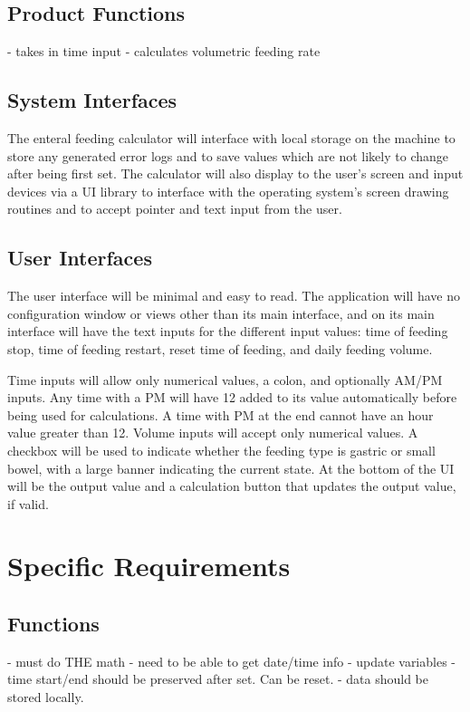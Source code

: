 \documentclass[10pt,draftclsnofoot,onecolumn]{IEEEtran}
\begin{document}
\subsection{Product Functions}
- takes in time input
- calculates volumetric feeding rate

\subsection{System Interfaces}
The enteral feeding calculator will interface with local storage on the machine to store any generated 
error logs and to save values which are not likely to change after being first set. The calculator will
also display to the user's screen and input devices via a UI library to interface with the operating system's screen drawing
routines and to accept pointer and text input from the user.

\subsection{User Interfaces}
The user interface will be minimal and easy to read. The application will have no configuration window
or views other than its main interface, and on its main interface will have the text inputs for the different
input values: time of feeding stop, time of feeding restart, reset time of feeding, and daily feeding volume.

Time inputs will allow only numerical values, a colon, and optionally AM/PM inputs. Any time with a PM will
have 12 added to its value automatically before being used for calculations. A time with PM at the end cannot have an hour value greater than 12.
Volume inputs will accept only numerical values. A checkbox will be used to indicate whether the feeding type is gastric or
small bowel, with a large banner indicating the current state. At the bottom of the UI will be the output value and a calculation
button that updates the output value, if valid.

\section{Specific Requirements}

\subsection{Functions}
- must do THE math
- need to be able to get date/time info
- update variables
- time start/end should be preserved after set. Can be reset.
- data should be stored locally.
\end{document}
